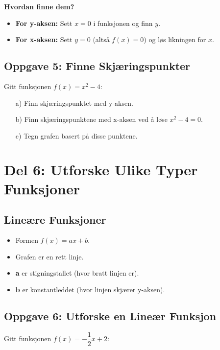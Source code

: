 \documentclass[12pt]{article}
\begin{document}
\textbf{Hvordan finne dem?}

\begin{itemize}
    \item \textbf{For y-aksen:} Sett \( x = 0 \) i funksjonen og finn \( y \).
    \item \textbf{For x-aksen:} Sett \( y = 0 \) (altså \( f(x) = 0 \)) og løs likningen for \( x \).
\end{itemize}

\subsection*{Oppgave 5: Finne Skjæringspunkter}

Gitt funksjonen \( f(x) = x^2 - 4 \):

\begin{enumerate}
    \item[a)] Finn skjæringspunktet med y-aksen.
    \item[b)] Finn skjæringspunktene med x-aksen ved å løse \( x^2 - 4 = 0 \).
    \item[c)] Tegn grafen basert på disse punktene.
\end{enumerate}

\section*{Del 6: Utforske Ulike Typer Funksjoner}

\subsection*{Lineære Funksjoner}

\begin{itemize}
    \item Formen \( f(x) = ax + b \).
    \item Grafen er en rett linje.
    \item \textbf{a} er stigningstallet (hvor bratt linjen er).
    \item \textbf{b} er konstantleddet (hvor linjen skjærer y-aksen).
\end{itemize}

\subsection*{Oppgave 6: Utforske en Lineær Funksjon}

Gitt funksjonen \( f(x) = -\dfrac{1}{2}x + 2 \):
\end{document}
